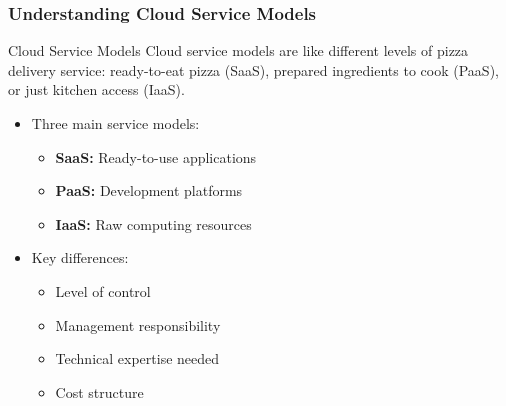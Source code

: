 \documentclass{beamer}
\begin{document}
\begin{frame}
    \frametitle{Understanding Cloud Service Models}
    
    \begin{alertblock}{Cloud Service Models}
        Cloud service models are like different levels of pizza delivery service: ready-to-eat pizza (SaaS), prepared ingredients to cook (PaaS), or just kitchen access (IaaS).
    \end{alertblock}
    
    \begin{itemize}
        \item Three main service models:
        \begin{itemize}
            \item \textbf{SaaS:} Ready-to-use applications
            \item \textbf{PaaS:} Development platforms
            \item \textbf{IaaS:} Raw computing resources
        \end{itemize}
        
        \item Key differences:
        \begin{itemize}
            \item Level of control
            \item Management responsibility
            \item Technical expertise needed
            \item Cost structure
        \end{itemize}
    \end{itemize}
\end{frame}
\end{document}

